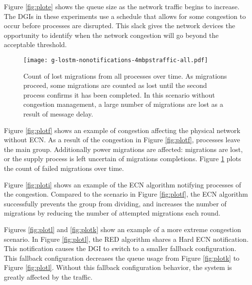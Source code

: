 Figure \ref{fig:plote} shows the queue size as the network traffic begins to increase.
The \ac{DGI}s in these experiments use a schedule that allows for some congestion to occur before processes are disrupted.
This slack gives the network devices the opportunity to identify when the network congestion will go beyond the acceptable threshold.

\begin{figure}
\centering
\texttt{[image: g-lostm-nonotifications-4mbpstraffic-all.pdf]}
\caption{Count of lost migrations from all processes over time. As migrations proceed, some migrations are counted as lost until the second process confirms it has been completed. In this scenario without congestion management, a large number of migrations are lost as a result of message delay.}
\label{fig:plotg}
\end{figure}

Figure \ref{fig:plotf} shows an example of congestion affecting the physical network without \ac{ECN}.
As a result of the congestion in Figure \ref{fig:plotf}, processes leave the main group.
Additionally power migrations are affected: migrations are lost, or the supply process is left uncertain of migrations completions.
Figure \ref{fig:plotg} plots the count of failed migrations over time.

Figure \ref{fig:ploti} shows an example of the \ac{ECN} algorithm notifying processes of the congestion.
Compared to the scenario in Figure \ref{fig:plotf}, the \ac{ECN} algorithm successfully prevents the group from dividing, and increases the number of migrations by reducing the number of attempted migrations each round.

Figures \ref{fig:plotl} and \ref{fig:plotk} show an example of a more extreme congestion scenario.
In Figure \ref{fig:plotl}, the \ac{RED} algorithm shares a Hard \ac{ECN} notification.
This notification causes the \ac{DGI} to switch to a smaller fallback configuration.
This fallback configuration decreases the queue usage from Figure \ref{fig:plotk} to Figure \ref{fig:plotl}.
Without this fallback configuration behavior, the system is greatly affected by the traffic.

